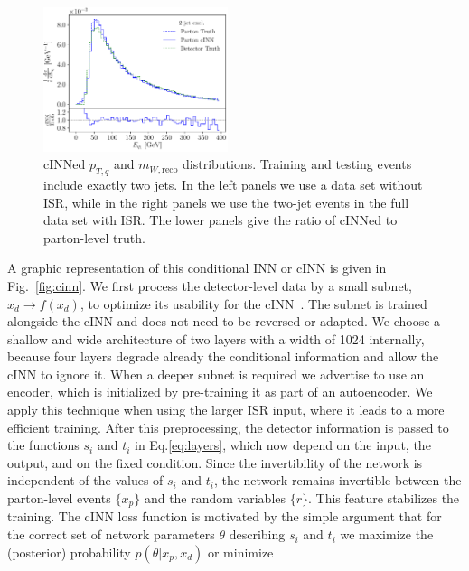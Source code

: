 \begin{figure}[t]
\includegraphics[page =19, width=0.48\textwidth]{figures/cINN/isr_2jonly_test}
\caption{cINNed $p_{T,q}$ and $m_{W,\text{reco}}$ distributions.  Training and
  testing events include exactly two jets. In the left panels we use a
  data set without ISR, while in the right panels we use the two-jet
  events in the full data set with ISR. The lower panels give the
  ratio of cINNed to parton-level truth.}
\label{fig:2j}
\end{figure}

A graphic representation of this conditional INN or cINN is given in
Fig.~\ref{fig:cinn}.  We first process the detector-level data by a
small subnet, \ie $x_d\to f(x_d)$, to optimize its usability for the cINN~\cite{cinn}. The
subnet is trained alongside the cINN and does not need to be reversed
or adapted.  We choose a shallow and wide architecture of two layers
with a width of 1024 internally, because four layers
degrade already the conditional information and allow the cINN to ignore it.
When a deeper subnet is required we advertise to use an
encoder, which is initialized by pre-training it as part of an autoencoder.
 We apply this technique when using the larger ISR input, where it leads 
 to a more efficient training.  After this preprocessing, the detector information is passed
to the functions $s_i$ and $t_i$ in Eq.\eqref{eq:layers}, which now
depend on the input, the output, and on the fixed condition. Since the
invertibility of the network is independent of the values of $s_i$ and
$t_i$, the network remains invertible between the parton-level events
$\{ x_p \}$ and the random variables $\{ r \}$.  This feature
stabilizes the training. The cINN loss function is motivated by the
simple argument that for the correct set of network parameters
$\theta$ describing $s_i$ and $t_i$ we maximize the (posterior)
probability $p(\theta |x_p,x_d)$ or minimize

